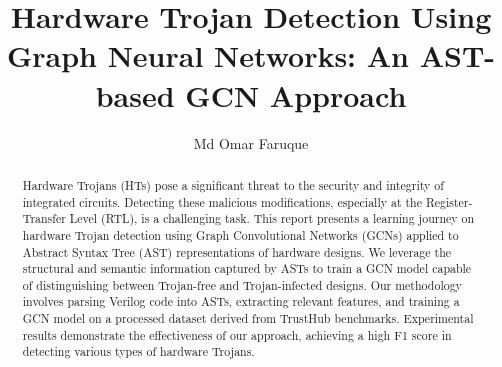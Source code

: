\documentclass[sigplan,screen]{acmart}
\begin{document}
\title[Hardware Trojan Detection using GNNs on ASTs]{Hardware Trojan Detection Using Graph Neural Networks: An AST-based GCN Approach}

\author{Md Omar Faruque} %

\renewcommand{\shortauthors}{Your Name et al.} %

\begin{abstract}
Hardware Trojans (HTs) pose a significant threat to the security and integrity of integrated circuits. Detecting these malicious modifications, especially at the Register-Transfer Level (RTL), is a challenging task. This report presents a learning journey on hardware Trojan detection using Graph Convolutional Networks (GCNs) applied to Abstract Syntax Tree (AST) representations of hardware designs. We leverage the structural and semantic information captured by ASTs to train a GCN model capable of distinguishing between Trojan-free and Trojan-infected designs. Our methodology involves parsing Verilog code into ASTs, extracting relevant features, and training a GCN model on a processed dataset derived from TrustHub benchmarks. Experimental results demonstrate the effectiveness of our approach, achieving a high F1 score in detecting various types of hardware Trojans.
\end{abstract}

\end{document}
